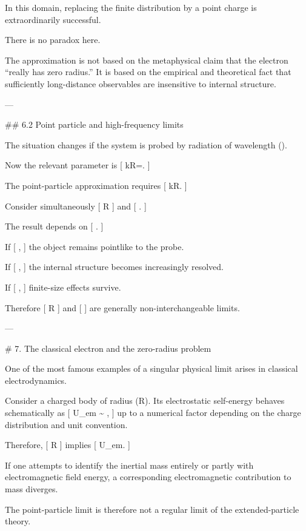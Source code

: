 In this domain, replacing the finite distribution by a point charge is extraordinarily successful.

There is no paradox here.

The approximation is not based on the metaphysical claim that the electron ``really has zero radius.'' It is based on the empirical and theoretical fact that sufficiently long-distance observables are insensitive to internal structure.

---

## 6.2 Point particle and high-frequency limits

The situation changes if the system is probed by radiation of wavelength (\lambda).

Now the relevant parameter is
[
kR=.
]

The point-particle approximation requires
[
kR.
]

Consider simultaneously
[
R
]
and
[
\lambda{}.
]

The result depends on
[
.
]

If
[
,
]
the object remains pointlike to the probe.

If
[
\rightarrow\infty,
]
the internal structure becomes increasingly resolved.

If
[
\rightarrow\alpha,
]
finite-size effects survive.

Therefore
[
R
]
and
[
\lambda{}
]
are generally non-interchangeable limits.

---

# 7. The classical electron and the zero-radius problem

One of the most famous examples of a singular physical limit arises in classical electrodynamics.

Consider a charged body of radius (R). Its electrostatic self-energy behaves schematically as
[
U_{\rm em}
\sim
{},
]
up to a numerical factor depending on the charge distribution and unit convention.

Therefore,
[
R
]
implies
[
U_{\rm em}\rightarrow\infty.
]

If one attempts to identify the inertial mass entirely or partly with electromagnetic field energy, a corresponding electromagnetic contribution to mass diverges.

The point-particle limit is therefore not a regular limit of the extended-particle theory.

